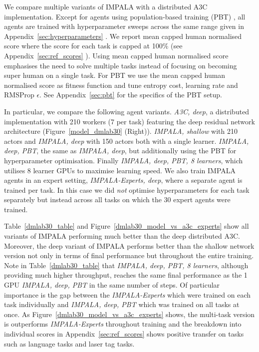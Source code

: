 We compare multiple variants of IMPALA with a distributed A3C implementation. Except for agents using population-based training (PBT) \cite{jaderberg2017pbt}, all agents are trained with hyperparameter sweeps across the same range given in Appendix~\ref{sec:hyperparameters}
. We report mean capped human normalised score where the score for each task is capped at 100\% (see Appendix~\ref{sec:ref_scores}
). Using mean capped human normalised score emphasises the need to solve multiple tasks instead of focusing on becoming super human on a single task. For PBT we use the mean capped human normalised score as fitness function and tune entropy cost, learning rate and RMSProp $\epsilon$. See Appendix~\ref{sec:pbt}
for the specifics of the PBT setup.


In particular, we compare the following agent variants. 
\textit{A3C, deep}, a distributed implementation with 210 workers (7 per task) featuring the deep residual network architecture (Figure~\ref{model_dmlab30} (Right)). \textit{IMPALA, shallow} with 210 actors and \textit{IMPALA, deep} with 150 actors both with a single learner. \textit{IMPALA, deep, PBT}, the same as \textit{IMPALA, deep}, but additionally using the PBT \cite{jaderberg2017pbt} for hyperparameter optimisation. Finally \textit{IMPALA, deep, PBT, 8 learners}, which utilises 8 learner GPUs to maximise learning speed. We also train IMPALA agents in an expert setting, \textit{IMPALA-Experts, deep}, where a separate agent is trained per task. In this case we did \textit{not} optimise hyperparameters for each task separately but instead across all tasks on which the 30 expert agents were trained.


Table~\ref{dmlab30_table} and Figure~\ref{dmlab30_model_vs_a3c_experts} show all variants of IMPALA performing much better than the deep distributed A3C. Moreover, the deep variant of IMPALA performs better than the shallow network version not only in terms of final performance but throughout the entire training. Note in Table~\ref{dmlab30_table} that \textit{IMPALA, deep, PBT, 8 learners}, although providing much higher throughput, reaches the same final performance as the 1 GPU \textit{IMPALA, deep, PBT} in the same number of steps.
Of particular importance is the gap between the \textit{IMPALA-Experts} which were trained on each task individually and \textit{IMPALA, deep, PBT} which was trained on all tasks at once.
As Figure~\ref{dmlab30_model_vs_a3c_experts} shows, the multi-task version is outperforms \textit{IMPALA-Experts} throughout training and the breakdown into individual scores in Appendix~\ref{sec:ref_scores}
shows positive transfer on tasks such as language tasks and laser tag tasks.

